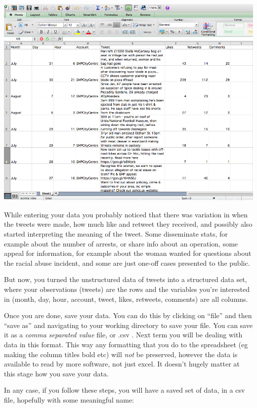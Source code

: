 \documentclass[]{book}
\theoremstyle{definition}
\theoremstyle{definition}
\theoremstyle{definition}
\theoremstyle{remark}
\begin{document}
\includegraphics{imgs/gmp_tweets.png}

While entering your data you probably noticed that there was variation
in when the tweets were made, how much like and retweet they received,
and possibly also started interpreting the meaning of the tweet. Some
disseminate stats, for example about the number of arrests, or share
info about an operation, some appeal for information, for example about
the woman wanted for questions about the racial abuse incident, and some
are just one-off cases presented to the public.

But now, you turned the unstructured data of tweets into a structured
data set, where your observations (tweets) are the rows and the
variables you're interested in (month, day, hour, account, tweet, likes,
retweets, comments) are all columns.

Once you are done, save your data. You can do this by clicking on
``file'' and then ``save as'' and navigating to your working directory
to save your file. You can save it as a \emph{comma separated value}
file, or .csv . Next term you will be dealing with data in this format.
This way any formatting that you do to the spreadsheet (eg making the
column titles bold etc) will \emph{not} be preserved, however the data
is available to read by more software, not just excel. It doesn't hugely
matter at this stage how you save your data.

In any case, if you follow these steps, you will have a saved set of
data, in a csv file, hopefully with some meaningful name:
\end{document}
